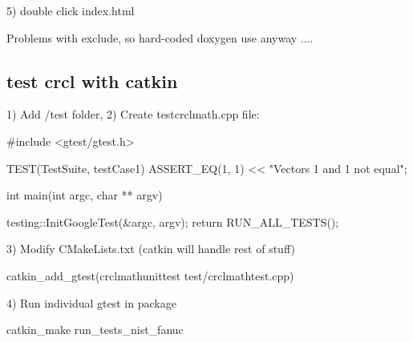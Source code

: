 5) double click index.\-html

Problems with exclude, so hard-\/coded doxygen use anyway ....

\subsection*{test crcl with catkin }

1) Add /test folder, 2) Create testcrclmath.\-cpp file\-: \begin{DoxyVerb}#include <gtest/gtest.h>

TEST(TestSuite, testCase1) {
    ASSERT_EQ(1, 1) << "Vectors 1 and 1 not equal";
}

int main(int argc, char ** argv) {

    testing::InitGoogleTest(&argc, argv);
    return RUN_ALL_TESTS();
}
\end{DoxyVerb}


3) Modify C\-Make\-Lists.\-txt (catkin will handle rest of stuff) \begin{DoxyVerb}catkin_add_gtest(crclmathunittest test/crclmathtest.cpp)
\end{DoxyVerb}


4) Run individual gtest in package \begin{DoxyVerb}catkin_make run_tests_nist_fanuc\end{DoxyVerb}
 